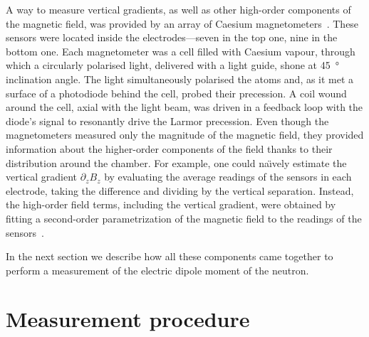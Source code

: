 A way to measure vertical gradients, as well as other high-order components of the magnetic field, was provided by an array of Caesium magnetometers~\cite{Groeger2005}. These sensors were located inside the electrodes---seven in the top one, nine in the bottom one. Each magnetometer was a cell filled with Caesium vapour, through which a circularly polarised light, delivered with a light guide, shone at \SI{45}{\degree} inclination angle. The light simultaneously polarised the atoms and, as it met a surface of a photodiode behind the cell, probed their precession. A coil wound around the cell, axial with the light beam, was driven in a feedback loop with the diode's signal to resonantly drive the Larmor precession. Even though the magnetometers measured only the magnitude of the magnetic field, they provided information about the higher-order components of the field thanks to their distribution around the chamber. For example, one could na\"\i vely estimate the vertical gradient $\partial_z B_z$ by evaluating the average readings of the sensors in each electrode, taking the difference and dividing by the vertical separation. Instead, the high-order field terms, including the vertical gradient, were obtained by fitting a second-order parametrization of the magnetic field to the readings of the sensors~\cite{WurstenThesis}.

In the next section we describe how all these components came together to perform a measurement of the electric dipole moment of the neutron.



\section{Measurement procedure}
\label{sec:measurement_procedure}


